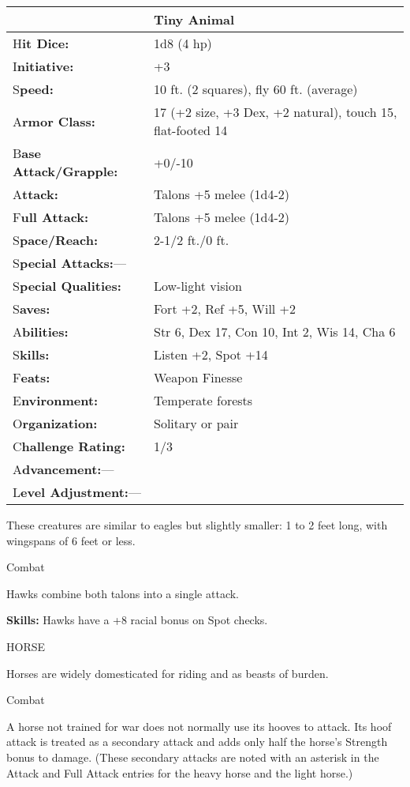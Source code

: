 \documentclass{article}
\begin{document}
\begin{tabular}{|>{\raggedright}p{91pt}|>{\raggedright}p{226pt}|}
\hline
  & Tiny Animal\tabularnewline
\hline
H\textbf{it Dice:} & 1d8 (4 hp)\tabularnewline
\hline
I\textbf{nitiative:} & +3\tabularnewline
\hline
S\textbf{peed:} & 10 ft. (2 squares), fly 60 ft. (average)\tabularnewline
\hline
A\textbf{rmor Class:} & 17 (+2 size, +3 Dex, +2 natural), touch 15, flat-footed 
14\tabularnewline
\hline
B\textbf{ase Attack/Grapple:} & +0/-10\tabularnewline
\hline
A\textbf{ttack:} & Talons +5 melee (1d4-2)\tabularnewline
\hline
F\textbf{ull Attack:} & Talons +5 melee (1d4-2)\tabularnewline
\hline
S\textbf{pace/Reach:} & 2-1/2 ft./0 ft.\tabularnewline
\hline
S\textbf{pecial Attacks:}--- & \tabularnewline
\hline
S\textbf{pecial Qualities:} & Low-light vision\tabularnewline
\hline
S\textbf{aves:} & Fort +2, Ref +5, Will +2\tabularnewline
\hline
A\textbf{bilities:} & Str 6, Dex 17, Con 10, Int 2, Wis 14, Cha 6\tabularnewline
\hline
S\textbf{kills:} & Listen +2, Spot +14\tabularnewline
\hline
F\textbf{eats:} & Weapon Finesse\tabularnewline
\hline
E\textbf{nvironment:} & Temperate forests\tabularnewline
\hline
O\textbf{rganization:} & Solitary or pair\tabularnewline
\hline
C\textbf{hallenge Rating:} & 1/3\tabularnewline
\hline
A\textbf{dvancement:}--- & \tabularnewline
\hline
L\textbf{evel Adjustment:}--- & \tabularnewline
\hline
\end{tabular}

These creatures are similar to eagles but slightly smaller: 1 to 2 feet long, with 
wingspans of 6 feet or less.

Combat

Hawks combine both talons into a single attack.

\textbf{Skills:} Hawks have a +8 racial bonus on Spot checks.

\vspace{12pt}
HORSE

Horses are widely domesticated for riding and as beasts of burden.

Combat

A horse not trained for war does not normally use its hooves to attack. Its hoof 
attack is treated as a secondary attack and adds only half the horse's Strength 
bonus to damage. (These secondary attacks are noted with an asterisk in the Attack 
and Full Attack entries for the heavy horse and the light horse.)
\end{document}
